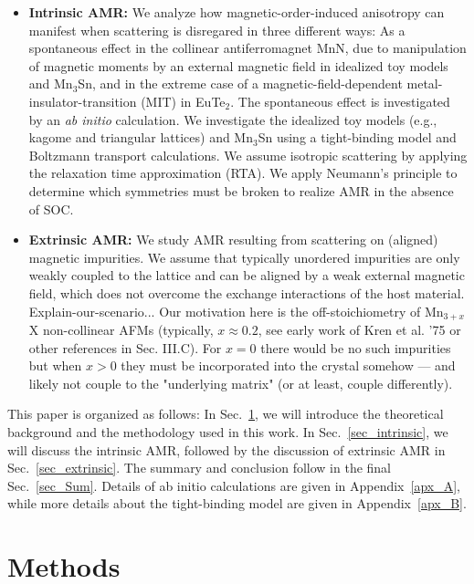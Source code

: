 \documentclass[prb,showpacs,amsmath,amssymb,superscriptaddress,twocolumn,floatfix]{revtex4-1}
\begin{document}
\begin{itemize}
	\item \textbf{Intrinsic AMR:} We analyze how magnetic-order-induced anisotropy can manifest when scattering is disregared in three different ways: As a spontaneous effect in the collinear antiferromagnet MnN, due to manipulation of magnetic moments by an external magnetic field in idealized toy models and Mn$_3$Sn, and in the extreme case of a magnetic-field-dependent metal-insulator-transition (MIT) in EuTe$_2$. The spontaneous effect is investigated by an \textit{ab initio} calculation. We investigate the idealized toy models (e.g., kagome and triangular lattices) and Mn$_3$Sn using a tight-binding model and Boltzmann transport calculations. We assume isotropic scattering by applying the relaxation time approximation (RTA). We apply Neumann’s principle to determine which symmetries must be broken to realize AMR in the absence of SOC.
	
	\item \textbf{Extrinsic AMR:} We study AMR resulting from scattering on (aligned) magnetic impurities. We assume that typically unordered impurities are only weakly coupled to the lattice and can be aligned by a weak external magnetic field, which does not overcome the exchange interactions of the host material.	{\color{red}Explain-our-scenario...}
        Our motivation here is the off-stoichiometry of Mn$_{3+x}$X 
        non-collinear AFMs (typically, $x\approx 0.2$, see early work of 
Kren et al. '75
	or other references in Sec. III.C). For $x=0$ there would be no
        such impurities but when $x>0$ they must be incorporated into the
        crystal somehow --- and likely not couple to the "underlying matrix"
        (or at least, couple differently).
\end{itemize}
 

This paper is organized as follows: In Sec.~\ref{sec_modelling}, we
will introduce the theoretical background and the methodology used in this work. In Sec.~\ref{sec_intrinsic}, we will discuss the intrinsic AMR, followed by the discussion of extrinsic AMR in Sec.~\ref{sec_extrinsic}. The summary and conclusion follow in the final Sec.~\ref{sec_Sum}. Details of ab initio calculations are given in Appendix~\ref{apx_A}, while more details about the tight-binding model are given in Appendix~\ref{apx_B}.

\section{Methods}
\label{sec_modelling}
\end{document}
